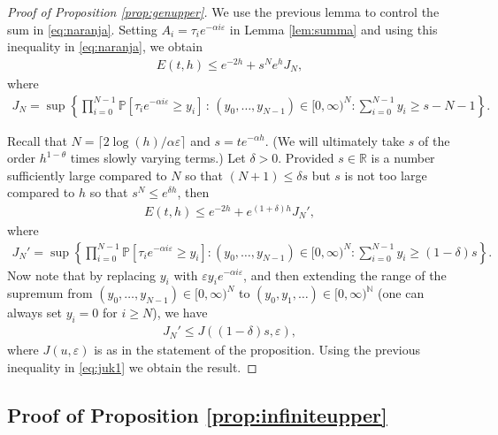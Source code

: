\documentclass[a4,12pt]{amsart}
\numberwithin{equation}{section}
\begin{document}
	\begin{proof}[Proof of Proposition \ref{prop:genupper}]

    We use the previous lemma to control the sum in \eqref{eq:naranja}. Setting $A_i = \tau_ie^{ - \alpha i \varepsilon }$ in Lemma \ref{lem:summa} and using this inequality in \eqref{eq:naranja}, we obtain
    \begin{align*}
    E(t,h) \leq e^{ -2h} + s^N e^h J_N,
    \end{align*}
where
\begin{align*}
	J_N = \sup \left\{  \prod_{i=0}^{N-1} \mathbb{P}\left[ \tau_i e^{ - \alpha i \varepsilon} \geq y_i \right] \,:\, (y_0,\ldots,y_{N-1}) \in [0,\infty)^N : \sum_{i=0}^{N-1} y_i \geq s-N-1 \right\}.
\end{align*}

Recall that $N = \lceil 2\log(h)/\alpha \varepsilon \rceil$ and $s = t e^{ - \alpha h}$. (We will ultimately take $s$ of the order $h^{1-\theta}$ times slowly varying terms.) Let $\delta > 0$. Provided $s\in\mathbb R$ is a number sufficiently large compared to $N$ so that $(N+1) \leq \delta s$ but $s$ is not too large compared to $h$ so that $s^N \leq e^{\delta h}$, then 
  \begin{align} \label{eq:juk1}
     E(t,h) \leq e^{ -2h} + e^{(1+\delta)h} J_N',
    \end{align}
where 
\begin{align*}
	J_N' = \sup \left\{  \prod_{i=0}^{N-1} \mathbb{P} \left[ \tau_i e^{ - \alpha i \varepsilon} \geq y_i \right] : (y_0,\ldots,y_{N-1}) \in [0,\infty)^N : \sum_{i=0}^{N-1} y_i \geq (1-\delta)s \right\}.
\end{align*}
Now note that by replacing $y_i $ with $\varepsilon y_i e^{ - \alpha i \varepsilon}$, and then extending the range of the supremum from $(y_0,\ldots,y_{N-1}) \in [0,\infty)^N$ to $(y_0,y_1,\ldots) \in [0,\infty)^{\mathbb{N}}$ (one can always set $y_i = 0$ for $i \geq N$), we have
\begin{align*}
J_N' \leq J( (1-\delta)s, \varepsilon),
\end{align*}
where $J(u,\varepsilon)$ is as in the statement of the proposition. Using the previous inequality in \eqref{eq:juk1} we obtain the result.
\end{proof}

\color{black}
\subsection{Proof of Proposition \ref{prop:infiniteupper}}
\end{document}

